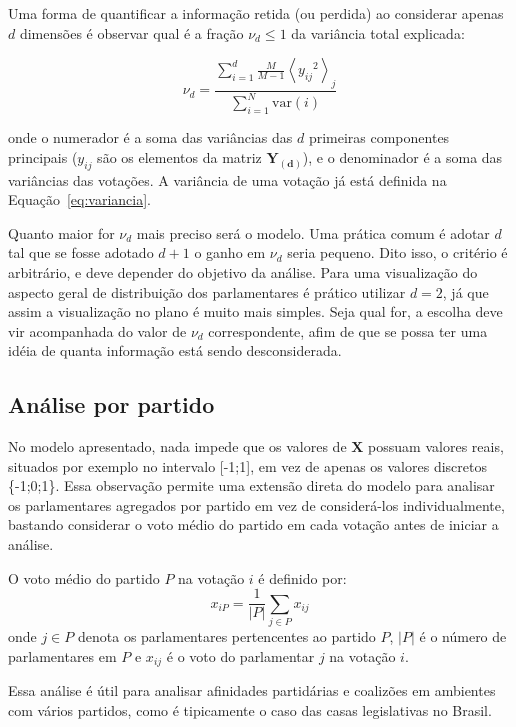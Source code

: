 \documentclass[
	article,			%
	12pt,				%
    twoside,			%
	a4paper,			%
	english,			%
	french,				%
	spanish,			%
	brazil,				%
	]{abntex2}
\begin{document}
Uma forma de quantificar a informação retida (ou perdida) ao considerar apenas $d$ dimensões é observar qual é a fração $\nu_d \leq 1$ da variância total explicada:

\begin{equation}
\nu_d = \frac{\sum_{i=1}^{d}\frac{M}{M-1} \left< {y_{ij}}^{2} \right>_j } {\sum_{i=1}^N \mathrm{var}(i)}
\label{eq:porcentagem-variancia}
\end{equation}

onde o numerador é a soma das variâncias das $d$ primeiras componentes principais ($y_{ij}$ são os elementos da matriz $\mathbf{Y_{(d)}}$), e o denominador é a soma das variâncias das votações. A variância de uma votação já está definida na Equação~\ref{eq:variancia}.

Quanto maior for $\nu_d$ mais preciso será o modelo. Uma prática comum é adotar $d$ tal que se fosse adotado $d+1$ o ganho em $\nu_d$ seria pequeno. Dito isso, o critério é arbitrário, e deve depender do objetivo da análise. Para uma visualização do aspecto geral de distribuição dos parlamentares é prático utilizar $d=2$, já que assim a visualização no plano é muito mais simples. Seja qual for, a escolha deve vir acompanhada do valor de $\nu_d$ correspondente, afim de que se possa ter uma idéia de quanta informação está sendo desconsiderada.

\subsection{Análise por partido}

No modelo apresentado, nada impede que os valores de $\mathbf{X}$ possuam valores reais, situados por exemplo no intervalo [-1;1], em vez de apenas os valores discretos \{-1;0;1\}. Essa observação permite uma extensão direta do modelo para analisar os parlamentares agregados por partido em vez de considerá-los individualmente, bastando considerar o voto médio do partido em cada votação antes de iniciar a análise.

O voto médio do partido $P$ na votação $i$ é definido por:
\begin{equation}
  x_{iP} = \frac{1}{|P|}\sum_{j\in P} x_{ij}
  \label{eq:voto-partido}
\end{equation}
onde $j \in P$ denota os parlamentares pertencentes ao partido $P$, $|P|$ é o número de parlamentares em $P$ e $x_{ij}$ é o voto do parlamentar $j$ na votação $i$.

Essa análise é útil para analisar afinidades partidárias e coalizões em ambientes com vários partidos, como é tipicamente o caso das casas legislativas no Brasil.
\end{document}
